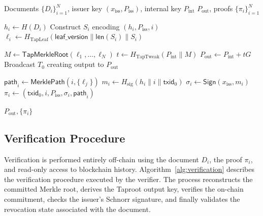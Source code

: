\documentclass{IEEEoj}
\begin{document}
\begin{algorithm}[t]
\caption{Batch Commitment and Proof Generation}
\label{alg:p2tr_commit}
\begin{algorithmic}[1]
\Require Documents $\{D_i\}_{i=1}^{N}$, issuer key $(x_{\mathrm{iss}}, P_{\mathrm{iss}})$, internal key $P_{\mathrm{int}}$
\Ensure $P_{\mathrm{out}}$, proofs $\{\pi_i\}_{i=1}^{N}$

    \State $h_i \gets H(D_i)$
    \State Construct $S_i$ encoding $(h_i, P_{\mathrm{iss}}, i)$
    \State $\ell_i \gets H_{\text{TapLeaf}}(\textsf{leaf\_version} \parallel \textsf{len}(S_i) \parallel S_i)$
\EndFor

\State $M \gets \textsf{TapMerkleRoot}(\ell_1,\ldots,\ell_N)$
\State $t \gets H_{\text{TapTweak}}(P_{\mathrm{int}} \parallel M)$
\State $P_{\mathrm{out}} \gets P_{\mathrm{int}} + tG$
\State Broadcast $T_0$ creating output to $P_{\mathrm{out}}$

    \State $\mathsf{path}_i \gets \textsf{MerklePath}(i, \{\ell_j\})$
    \State $m_i \gets H_{\mathrm{sig}}(h_i \parallel i \parallel \mathsf{txid}_0)$
    \State $\sigma_i \gets \textsf{Sign}(x_{\mathrm{iss}}, m_i)$
    \State $\pi_i \gets (\mathsf{txid}_0, i, P_{\mathrm{iss}}, \sigma_i, \mathsf{path}_i)$
\EndFor

\State \Return $P_{\mathrm{out}}, \{\pi_i\}$
\end{algorithmic}
\end{algorithm}

\subsection{Verification Procedure}
\label{sec:verification_procedure}

Verification is performed entirely off-chain using the document $D_i$, the proof $\pi_i$, and read-only access to blockchain history. 
Algorithm~\ref{alg:verification} describes the verification procedure executed by the verifier. 
The process reconstructs the committed Merkle root, derives the Taproot output key, verifies the on-chain commitment, checks the issuer's Schnorr signature, and finally validates the revocation state associated with the document.
\end{document}
